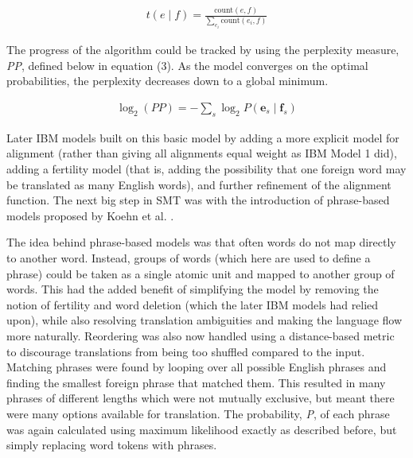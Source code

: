 \documentclass[11pt]{article}
\begin{document}
\begin{align}
t(e \mid f) = \frac{\textrm{count}(e, f)}{\sum_{e_i} \textrm{count}(e_i, f)}
\end{align}

The progress of the algorithm could be tracked by using the perplexity measure, \textit{PP}, defined below in equation (3). As the model converges on the optimal probabilities, the perplexity decreases down to a global minimum.

\begin{align}
    \log_2(PP) = - \sum_s \log_2 P( \textbf{e}_s \mid \textbf{f}_s )
    \label{perplexity}
\end{align}

Later IBM models built on this basic model by adding a more explicit model for alignment (rather than giving all alignments equal weight as IBM Model 1 did), adding a fertility model (that is, adding the possibility that one foreign word may be translated as many English words), and further refinement of the alignment function. The next big step in SMT was with the introduction of phrase-based models proposed by Koehn et al. \citeyearpar{koehn-etal-2003-statistical}.

\bigskip

The idea behind phrase-based models was that often words do not map directly to another word. Instead, groups of words (which here are used to define a phrase) could be taken as a single atomic unit and mapped to another group of words. This had the added benefit of simplifying the model by removing the notion of fertility and word deletion (which the later IBM models had relied upon), while also resolving translation ambiguities and making the language flow more naturally. Reordering was also now handled using a distance-based metric to discourage translations from being too shuffled compared to the input. Matching phrases were found by looping over all possible English phrases and finding the smallest foreign phrase that matched them. This resulted in many phrases of different lengths which were not mutually exclusive, but meant there were many options available for translation. The probability, \textit{P}, of each phrase was again calculated using maximum likelihood exactly as described before, but simply replacing word tokens with phrases.

\bigskip
\end{document}
